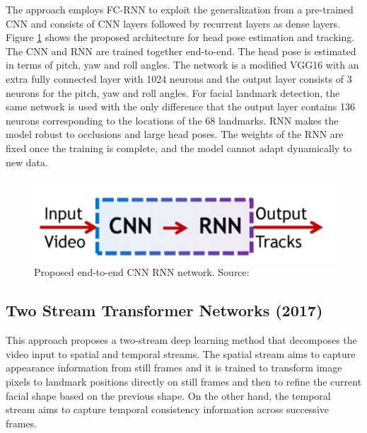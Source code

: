 \documentclass{llncs}
\begin{document}
The approach employs FC-RNN to exploit the generalization from a pre-trained CNN and consists of CNN layers followed by recurrent layers as dense layers. Figure \ref{cnn_rnn} shows the proposed architecture for head pose estimation and tracking. The CNN and RNN are trained together end-to-end. The head pose is estimated in terms of pitch, yaw and roll angles. The network is a modified VGG16 with an extra fully connected layer with 1024 neurons and the output layer consists of 3 neurons for the pitch, yaw and roll angles. For facial landmark detection, the same network is used with the only difference that the output layer contains 136 neurons corresponding to the locations of the 68 landmarks. RNN makes the model robust to occlusions and large head poses.
The weights of the RNN are fixed once the training is complete, and the model cannot adapt dynamically to new data.

\begin{figure}
	\centering
	\includegraphics[scale=0.3]{Media/cnn_rnn}
	\vspace{-3mm}
	\caption{Proposed end-to-end CNN RNN network. Source:\cite{dynamic_facial_analysis}}
	\label{cnn_rnn}
	\vspace{-3mm}
\end{figure}

	\subsection{Two Stream Transformer Networks (2017) \cite{tstn}}
This approach proposes a two-stream deep learning method that decomposes the video input to spatial and temporal streams. The spatial stream aims to capture appearance information from still frames and it is trained to transform image pixels to landmark positions directly on still frames and then to refine the current facial shape based on the previous shape. On the other hand, the temporal stream aims to capture temporal consistency information across successive frames.
\end{document}
